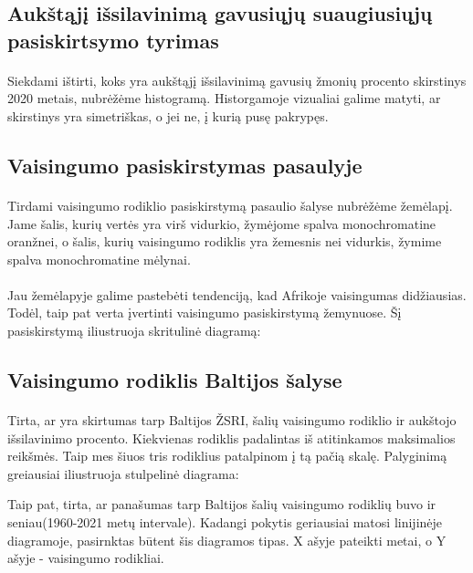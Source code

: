 \pagebreak

\subsection{Aukštąjį išsilavinimą gavusiųjų suaugiusiųjų pasiskirtsymo tyrimas} 

\paragraph{} Siekdami ištirti, koks yra aukštąjį išsilavinimą gavusių žmonių procento skirstinys 2020 metais, nubrėžėme histogramą. Historgamoje vizualiai galime matyti, ar skirstinys yra simetriškas, o jei ne, į kurią pusę pakrypęs.
\pagebreak

\subsection{Vaisingumo pasiskirstymas pasaulyje}
\paragraph{} Tirdami vaisingumo rodiklio pasiskirstymą pasaulio šalyse nubrėžėme žemėlapį. Jame šalis, kurių vertės yra virš vidurkio, žymėjome spalva monochromatine oranžnei, o šalis, kurių vaisingumo rodiklis yra žemesnis nei vidurkis, žymime spalva monochromatine mėlynai.

\paragraph{} Jau žemėlapyje galime pastebėti tendenciją, kad Afrikoje vaisingumas didžiausias. Todėl, taip pat verta įvertinti vaisingumo pasiskirstymą žemynuose. Šį pasiskirstymą iliustruoja skritulinė diagramą:
\pagebreak

\subsection{Vaisingumo rodiklis Baltijos šalyse}
\paragraph{} Tirta, ar yra skirtumas tarp Baltijos ŽSRI, šalių vaisingumo rodiklio ir aukštojo išsilavinimo procento. Kiekvienas rodiklis padalintas iš atitinkamos maksimalios reikšmės. Taip mes šiuos tris rodiklius patalpinom į tą pačią skalę. Palyginimą greiausiai iliustruoja stulpelinė diagrama:

Taip pat, tirta, ar panašumas tarp Baltijos šalių vaisingumo rodiklių buvo ir seniau(1960-2021 metų intervale). Kadangi pokytis geriausiai matosi linijinėje diagramoje, pasirnktas būtent šis diagramos tipas. X ašyje pateikti metai, o Y ašyje - vaisingumo rodikliai.
